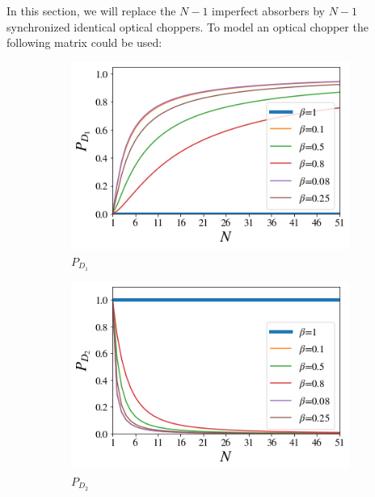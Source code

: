 \documentclass[12pt]{book}
\begin{document}
In this section, we will replace the $N-1$ imperfect absorbers by $N-1$ synchronized identical optical choppers. To model an optical chopper the following matrix could be used:
 \begin{figure}[!t]
 
\centering
\begin{subfigure}[b]{0.45\linewidth}
\includegraphics[width=\linewidth]{images/ChopperD1.png}
\caption{$P_{D_{1}}$}
\label{fig:BS1}
\end{subfigure}
\begin{subfigure}[b]{0.45\linewidth}
\includegraphics[width=\linewidth]{images/ChopperD2.png}
\caption{$P_{D_{2}}$}
\label{fig:westminster_aerea}
\end{subfigure}
\begin{subfigure}[b]{0.45\linewidth}

\end{subfigure}
\end{figure}
\end{document}
